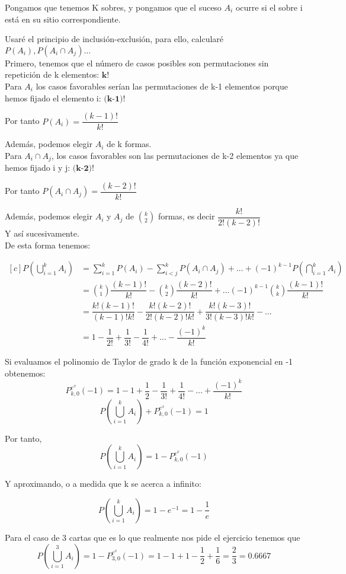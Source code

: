 Pongamos que tenemos K sobres, y pongamos que el suceso $A_i$ ocurre si el sobre i está en su sitio correspondiente.

Usaré el principio de inclusión-exclusión, para ello, calcularé $P(A_i), P(A_i\cap A_j) \dots$ \\

Primero, tenemos que el número de casos posibles son permutaciones sin repetición de k elementos: $\textbf{k!}$ \\

Para $A_i$ los casos favorables serían las permutaciones de k-1 elementos porque hemos fijado el elemento i: $\textbf{(k-1)!}$

Por tanto $P(A_i) = \dfrac{(k-1)!}{k!}$ 

Además, podemos elegir $A_i$ de k formas.\\

Para $A_i \cap A_j$, los casos favorables son las permutaciones de k-2 elementos ya que hemos fijado i y j: $\textbf{(k-2)!}$

Por tanto $P(A_i \cap A_j) = \dfrac{(k-2)!}{k!}$

Además, podemos elegir $A_i$ y $A_j$ de $k \choose 2$ formas, es decir  $\dfrac{k!}{2!(k-2)!}$ \\

Y así sucesivamente.\\

De esta forma tenemos:

\begin{equation}
\begin{aligned}[c]
    P(\bigcup_{i=1}^k A_i) & = \sum_{i=1}^k P(A_i) - \sum_{i<j}^k P(A_i \cap A_j) + \dots + (-1)^{k-1}P(\bigcap_{i=1}^k A_i) \\
    & = {k \choose 1} \dfrac{(k-1)!}{k!} - {k \choose 2} \dfrac{(k-2)!}{k!} + \dots (-1)^{k-1} {k \choose k}\dfrac{(k-1)!}{k!}\\
    & = \dfrac{k!(k-1)!}{(k-1)!k!} - \dfrac{k!(k-2)!}{2!(k-2)!k!} + \dfrac{k!(k-3)!}{3!(k-3)!k!} - \dots \\
    & = 1- \dfrac{1}{2!} + \dfrac{1}{3!} - \dfrac{1}{4!} + \dots - \dfrac{(-1)^{k}}{k!}
\end{aligned}
\end{equation}

Si evaluamos el polinomio de Taylor de grado k de la función exponencial en -1 obtenemos:
$$ P_{k,0}^{e^x} (-1)= 1 - 1 + \dfrac{1}{2} - \dfrac{1}{3!}+ \dfrac{1}{4!} - \dots + \dfrac{(-1)^{k}}{k!}$$
$$ P(\bigcup_{i=1}^k A_i) + P_{k,0}^{e^x} (-1) = 1$$

Por tanto, 
$$ P(\bigcup_{i=1}^k A_i) = 1 - P_{k,0}^{e^x} (-1)$$

Y aproximando, o a medida que k se acerca a infinito:

$$ P(\bigcup_{i=1}^k A_i) = 1 - e^{-1} = 1 - \dfrac{1}{e}$$


Para el caso de 3 cartas que es lo que realmente nos pide el ejercicio tenemos que 
$$ P(\bigcup_{i=1}^3 A_i) = 1 - P_{3,0}^{e^x} (-1) = 1 - 1 + 1 - \dfrac{1}{2} + \dfrac{1}{6} = \dfrac{2}{3} = 0.6667$$
